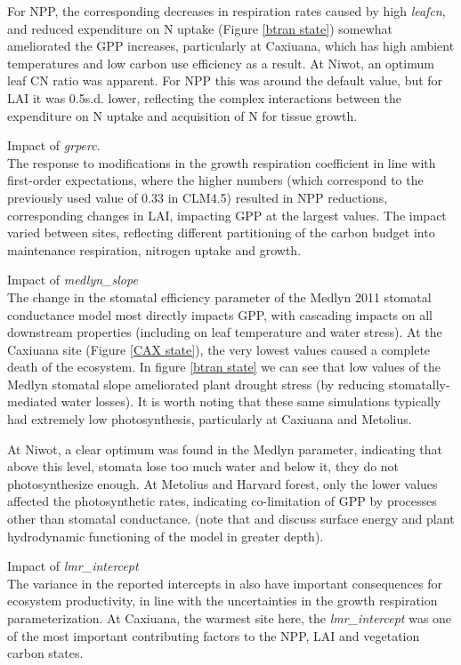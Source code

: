 \documentclass[draft,linenumbers]{agujournal}
\begin{document}
For NPP, the corresponding decreases in respiration rates caused by high \emph{leafcn}, and reduced expenditure on N uptake (Figure \ref{btran state}) somewhat ameliorated the GPP increases, particularly at Caxiuana, which has high ambient temperatures and low carbon use efficiency as a result. At Niwot, an optimum leaf CN ratio was apparent. For NPP this was around the default value, but for LAI it was 0.5s.d. lower, reflecting the complex interactions between the expenditure on N uptake and acquisition of N for tissue growth. 

Impact of \emph{grperc}.\\
The response to modifications in the growth respiration coefficient in line with first-order expectations, where the higher numbers (which correspond to the previously used value of 0.33 in CLM4.5) resulted in  NPP reductions, corresponding changes in LAI, impacting GPP at the largest values.   The impact varied between sites, reflecting different partitioning of the carbon budget into maintenance respiration, nitrogen uptake and growth. 

Impact of \emph{medlyn\_slope}\\
The change in the stomatal efficiency parameter of the Medlyn 2011 stomatal conductance model most directly impacts GPP, with cascading impacts on all downstream properties (including on leaf temperature and water stress). At the Caxiuana site (Figure \ref{CAX state}), the very lowest values caused a complete death of the ecosystem. In figure 
\ref{btran state} we can see that low values of the Medlyn stomatal slope ameliorated plant drought stress (by reducing stomatally-mediated water losses). It is worth noting that these same simulations typically had extremely low photosynthesis, particularly at Caxiuana and Metolius. 

At Niwot, a clear optimum was found in the Medlyn parameter, indicating that above this level, stomata lose too much water and below it, they do not photosynthesize enough. At Metolius and Harvard forest, only the lower values affected the photosynthetic rates, indicating co-limitation of GPP by processes other than stomatal conductance. (note that \cite{kennedy} and \cite{dagon} discuss surface energy and plant hydrodynamic functioning of the model in greater depth). 

Impact of \emph{lmr\_intercept}\\
The variance in the reported intercepts in \cite{atkin2016} also have important consequences for ecosystem productivity, in line with the uncertainties in the growth respiration parameterization. At Caxiuana, the warmest site here, the \emph{lmr\_intercept} was one of the most important contributing factors to the NPP, LAI and vegetation carbon states.  
\end{document}
